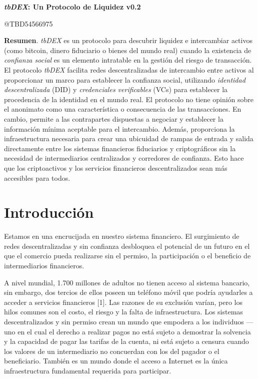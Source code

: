 \documentclass[11pt]{article}
\begin{document}
\begin{center}
{\LARGE \textbf{\textit{tbDEX}: Un Protocolo de Liquidez v0.2}}
\end{center}


\vspace{1\baselineskip}
\begin{center}
{\large \textcolor[HTML]{999999}{@TBD54566975}}
\end{center}


\vspace{2\baselineskip}
\textbf{Resumen}. \textit{tbDEX} es un protocolo para descubrir liquidez e intercambiar activos (como bitcoin, dinero fiduciario o bienes del mundo real) cuando la existencia de \textit{confianza social} es un elemento intratable en la gestión del riesgo de transacción. El protocolo \textit{tbDEX} facilita redes descentralizadas de intercambio entre activos al proporcionar un marco para establecer la confianza social, utilizando \textit{identidad descentralizada} (DID) y \textit{credenciales verificables} (VCs) para establecer la procedencia de la identidad en el mundo real. El protocolo no tiene opinión sobre el anonimato como una característica o consecuencia de las transacciones. En cambio, permite a las contrapartes dispuestas a negociar y establecer la información mínima aceptable para el intercambio. Además, proporciona la infraestructura necesaria para crear una ubicuidad de rampas de entrada y salida directamente entre los sistemas financieros fiduciarios y criptográficos sin la necesidad de intermediarios centralizados y corredores de confianza. Esto hace que los criptoactivos y los servicios financieros descentralizados sean más accesibles para todos.

\vspace{1\baselineskip}
\section{Introducción}


\vspace{1\baselineskip}
Estamos en una encrucijada en nuestro sistema financiero. El surgimiento de redes descentralizadas y sin confianza desbloquea el potencial de un futuro en el que el comercio pueda realizarse sin el permiso, la participación o el beneficio de intermediarios financieros.

\vspace{1\baselineskip}
A nivel mundial, 1.700 millones de adultos no tienen acceso al sistema bancario, sin embargo, dos tercios de ellos poseen un teléfono móvil que podría ayudarles a acceder a servicios financieros [1]. Las razones de su exclusión varían, pero los hilos comunes son el costo, el riesgo y la falta de infraestructura. Los sistemas descentralizados y sin permiso crean un mundo que empodera a los individuos \textcolor[HTML]{202124}{— uno en el cual} el derecho a realizar pagos no está sujeto a demostrar la solvencia y la capacidad de pagar las tarifas de la cuenta, ni está sujeto a censura cuando los valores de un intermediario no concuerdan con los del pagador o el beneficiario. También es un mundo donde el acceso a Internet es la única infraestructura fundamental requerida para participar.
\end{document}
